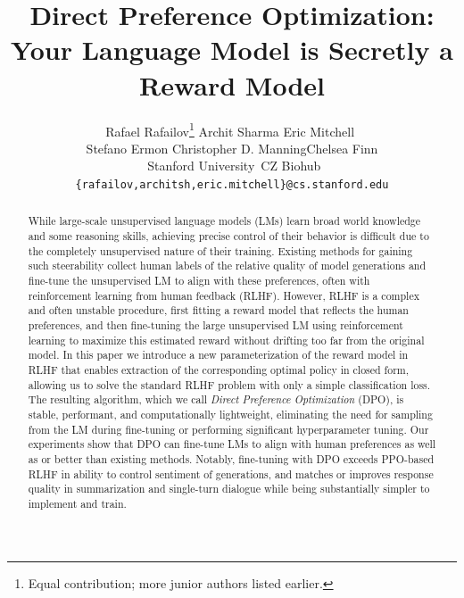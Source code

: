 \documentclass{article}
\title{Direct Preference Optimization:\\ Your Language Model is Secretly a Reward Model}
\author{
  Rafael Rafailov\thanks{Equal contribution; more junior authors listed earlier.}\,\,\footnotemark[2] \And Archit Sharma\footnotemark[1]\,\,\footnotemark[2] \And Eric Mitchell\footnotemark[1]\,\,\footnotemark[2] \\
  \AND Stefano Ermon\footnotemark[2]\,\,\footnotemark[3] \And Christopher D. Manning\footnotemark[2] \And Chelsea Finn\footnotemark[2] \\
  \AND \textnormal{\footnotemark[2]\,\,Stanford University \footnotemark[3]\,\;CZ Biohub} \\
  \texttt{\{rafailov,architsh,eric.mitchell\}@cs.stanford.edu}
}
\newcommand{\rev}[2]{{#2}}
\begin{document}
\maketitle

\begin{abstract}
While large-scale unsupervised language models (LMs) learn broad world knowledge and some reasoning skills, achieving precise control of their behavior is difficult due to the completely unsupervised nature of their training.
Existing methods for gaining such steerability collect human labels of the relative quality of model generations and fine-tune the unsupervised LM to align with these preferences, often with reinforcement learning from human feedback (RLHF).
However, RLHF is a complex and often unstable procedure, first fitting a reward model that reflects the human preferences, and then fine-tuning the large unsupervised LM using reinforcement learning to maximize this estimated reward without drifting too far from the original model.
\rev{In this paper, we leverage a mapping between reward functions and optimal policies to show that this constrained reward maximization problem can be \emph{optimized exactly} with a single stage of policy training, essentially solving a classification problem on the human preference data.}{In this paper we introduce a new parameterization of the reward model in RLHF that enables extraction of the corresponding optimal policy in closed form, allowing us to solve the standard RLHF problem with only a simple classification loss.}
The resulting algorithm, which we call \textit{Direct Preference Optimization} (DPO), is stable, performant, and computationally lightweight, eliminating the need for \rev{fitting a reward model,}{} sampling from the LM during fine-tuning or performing significant hyperparameter tuning.
Our experiments show that DPO can fine-tune LMs to align with human preferences as well as or better than existing methods. Notably, fine-tuning with DPO exceeds PPO-based RLHF in ability to control sentiment of generations, and matches or improves response quality in summarization and single-turn dialogue while being substantially simpler to implement and train.

\end{abstract}
\end{document}
